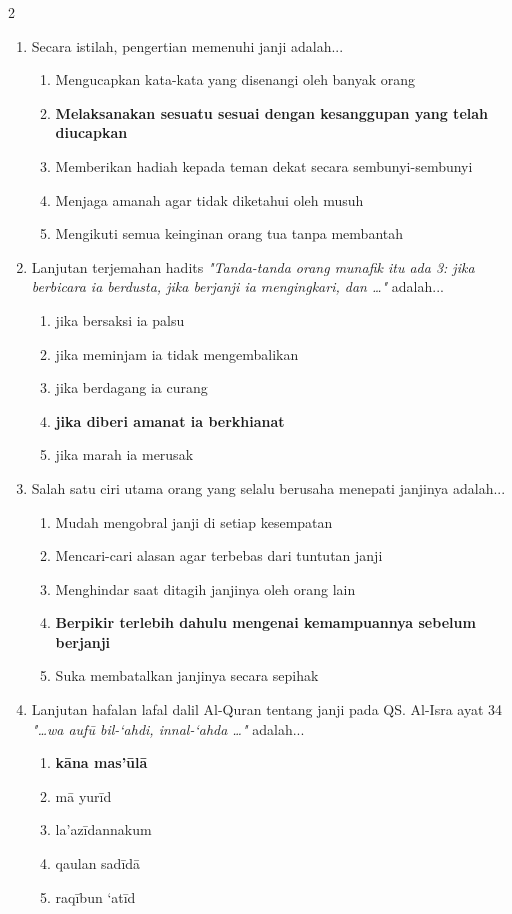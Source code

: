 \documentclass[10pt,a4paper]{article}
\begin{document}
\begin{multicols}{2}
\begin{enumerate}
    \item Secara istilah, pengertian memenuhi janji adalah...
    \begin{enumerate}
      \item Mengucapkan kata-kata yang disenangi oleh banyak orang
      \item \textbf{Melaksanakan sesuatu sesuai dengan kesanggupan yang telah diucapkan}
      \item Memberikan hadiah kepada teman dekat secara sembunyi-sembunyi
      \item Menjaga amanah agar tidak diketahui oleh musuh
      \item Mengikuti semua keinginan orang tua tanpa membantah
    \end{enumerate}

    \item Lanjutan terjemahan hadits \textit{"Tanda-tanda orang munafik itu ada 3: jika berbicara ia berdusta, jika berjanji ia mengingkari, dan \dots"} adalah...
    \begin{enumerate}
      \item jika bersaksi ia palsu
      \item jika meminjam ia tidak mengembalikan
      \item jika berdagang ia curang
      \item \textbf{jika diberi amanat ia berkhianat}
      \item jika marah ia merusak
    \end{enumerate}

    \item Salah satu ciri utama orang yang selalu berusaha menepati janjinya adalah...
    \begin{enumerate}
      \item Mudah mengobral janji di setiap kesempatan
      \item Mencari-cari alasan agar terbebas dari tuntutan janji
      \item Menghindar saat ditagih janjinya oleh orang lain
      \item \textbf{Berpikir terlebih dahulu mengenai kemampuannya sebelum berjanji}
      \item Suka membatalkan janjinya secara sepihak
    \end{enumerate}

    \item Lanjutan hafalan lafal dalil Al-Quran tentang janji pada QS. Al-Isra ayat 34 \textit{"\dots wa aufū bil-‘ahdi, innal-‘ahda \dots"} adalah...
    \begin{enumerate}
      \item \textbf{kāna mas’ūlā}
      \item mā yurīd
      \item la’azīdannakum
      \item qaulan sadīdā
      \item raqībun ‘atīd
    \end{enumerate}


\end{enumerate}
\end{multicols}
\end{document}
